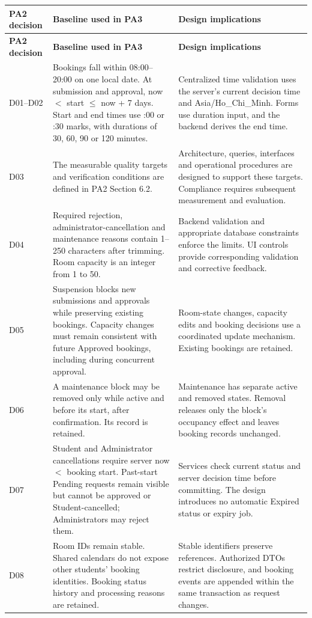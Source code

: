 \begin{longtable}{|p{}|p{}|p{}|}
\hline
\textbf{PA2 decision} & \textbf{Baseline used in PA3} & \textbf{Design implications} \\
\hline
\endfirsthead
\hline
\textbf{PA2 decision} & \textbf{Baseline used in PA3} & \textbf{Design implications} \\
\hline
\endhead
D01--D02 &
Bookings fall within 08:00--20:00 on one local date. At submission and approval, now $<$ start $\leq$ now + 7 days. Start and end times use :00 or :30 marks, with durations of 30, 60, 90 or 120 minutes. &
Centralized time validation uses the server's current decision time and Asia/Ho\_Chi\_Minh. Forms use duration input, and the backend derives the end time. \\
\hline
D03 &
The measurable quality targets and verification conditions are defined in PA2 Section 6.2. &
Architecture, queries, interfaces and operational procedures are designed to support these targets. Compliance requires subsequent measurement and evaluation. \\
\hline
D04 &
Required rejection, administrator-cancellation and maintenance reasons contain 1--250 characters after trimming. Room capacity is an integer from 1 to 50. &
Backend validation and appropriate database constraints enforce the limits. UI controls provide corresponding validation and corrective feedback. \\
\hline
D05 &
Suspension blocks new submissions and approvals while preserving existing bookings. Capacity changes must remain consistent with future Approved bookings, including during concurrent approval. &
Room-state changes, capacity edits and booking decisions use a coordinated update mechanism. Existing bookings are retained. \\
\hline
D06 &
A maintenance block may be removed only while active and before its start, after confirmation. Its record is retained. &
Maintenance has separate active and removed states. Removal releases only the block's occupancy effect and leaves booking records unchanged. \\
\hline
D07 &
Student and Administrator cancellations require server now $<$ booking start. Past-start Pending requests remain visible but cannot be approved or Student-cancelled; Administrators may reject them. &
Services check current status and server decision time before committing. The design introduces no automatic Expired status or expiry job. \\
\hline
D08 &
Room IDs remain stable. Shared calendars do not expose other students' booking identities. Booking status history and processing reasons are retained. &
Stable identifiers preserve references. Authorized DTOs restrict disclosure, and booking events are appended within the same transaction as request changes. \\
\hline
\end{longtable}